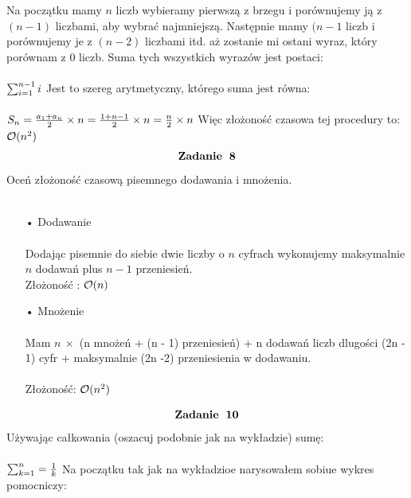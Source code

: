 \documentclass[fleqn]{article}
\begin{document}
 Na początku mamy $n$ liczb wybieramy pierwszą z brzegu i porównujemy ją z $(n-1)$ liczbami, aby wybrać najmniejszą. Następnie mamy $(n-1$ liczb i porównujemy je z $(n-2)$ liczbami itd. aż zostanie mi ostani wyraz, który porównam z $0$ liczb. Suma tych wszystkich wyrazów jest postaci: \\ \\
 $
 \sum_{i=1}^{n-1}i \newline \newline
 $
 Jest to szereg arytmetyczny, którego suma jest równa: \\ \\
 $
 S_{n} =\frac{a_{1} +a_{n}}{2} \times n = \frac{1 + n -1}{2} \times n = \frac{n}{2} \times n \newline \newline   
 $
 Więc złożoność czasowa tej procedury to: 
 $
 \mathcal{O}(n^2) \newline \newline
 $
 \newpage
 \[\huge \bf Zadanie \ 8\] 
 Oceń złożoność czasową pisemnego dodawania i mnożenia. \\ \\
 \begin{itemize}
 \item[•] Dodawanie \\ \\
 Dodając pisemnie do siebie dwie liczby o $n$ cyfrach wykonujemy maksymalnie $n$ dodawań plus $n-1$ przeniesień.\\
 Złożoność :  
 $
 \mathcal{O}(n) \newline \newline
 $
 \item[•] Mnożenie \\ \\
 Mam $n\ \times $  (n mnożeń + (n - 1) przeniesień) + n dodawań liczb dlugości (2n - 1) cyfr + maksymalnie (2n -2) przeniesienia w dodawaniu.
 \\ \\Złożoność:
  $
 \mathcal{O}(n^{2}) \newline \newline
 $
 \end{itemize}
 \[\huge \bf Zadanie \ 10\] 
Używając całkowania (oszacuj podobnie jak na wykładzie) sumę: \\ \\
$
\sum_{k=1}^n = \frac{1}{k} \newline \newline
$ 
Na początku tak jak na wykładzioe narysowałem sobiue wykres pomocniczy: \\ \\
\end{document}
